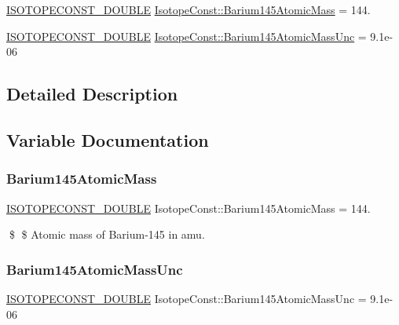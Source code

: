 \begin{DoxyCompactItemize}
\item 
\mbox{\hyperlink{group___isotope_const-_macros_ga8f45a7272ce02c0b4c65c44636ed719a}{I\+S\+O\+T\+O\+P\+E\+C\+O\+N\+S\+T\+\_\+\+D\+O\+U\+B\+LE}} \mbox{\hyperlink{group___isotope_const-_barium-_ba145_ga89cf9ac18bf4ffe732718f83e1350928}{Isotope\+Const\+::\+Barium145\+Atomic\+Mass}} = 144.
\item 
\mbox{\hyperlink{group___isotope_const-_macros_ga8f45a7272ce02c0b4c65c44636ed719a}{I\+S\+O\+T\+O\+P\+E\+C\+O\+N\+S\+T\+\_\+\+D\+O\+U\+B\+LE}} \mbox{\hyperlink{group___isotope_const-_barium-_ba145_ga00447b6fd8b1daad2d772c3b0420448e}{Isotope\+Const\+::\+Barium145\+Atomic\+Mass\+Unc}} = 9.\+1e-\/06
\end{DoxyCompactItemize}


\subsection{Detailed Description}


\subsection{Variable Documentation}
\mbox{\label{group___isotope_const-_barium-_ba145_ga89cf9ac18bf4ffe732718f83e1350928}} 
\subsubsection{\texorpdfstring{Barium145\+Atomic\+Mass}{Barium145AtomicMass}}
{\footnotesize\ttfamily \mbox{\hyperlink{group___isotope_const-_macros_ga8f45a7272ce02c0b4c65c44636ed719a}{I\+S\+O\+T\+O\+P\+E\+C\+O\+N\+S\+T\+\_\+\+D\+O\+U\+B\+LE}} Isotope\+Const\+::\+Barium145\+Atomic\+Mass = 144.}

\$ \$ Atomic mass of Barium-\/145 in amu. \mbox{\label{group___isotope_const-_barium-_ba145_ga00447b6fd8b1daad2d772c3b0420448e}} 
\subsubsection{\texorpdfstring{Barium145\+Atomic\+Mass\+Unc}{Barium145AtomicMassUnc}}
{\footnotesize\ttfamily \mbox{\hyperlink{group___isotope_const-_macros_ga8f45a7272ce02c0b4c65c44636ed719a}{I\+S\+O\+T\+O\+P\+E\+C\+O\+N\+S\+T\+\_\+\+D\+O\+U\+B\+LE}} Isotope\+Const\+::\+Barium145\+Atomic\+Mass\+Unc = 9.\+1e-\/06}

